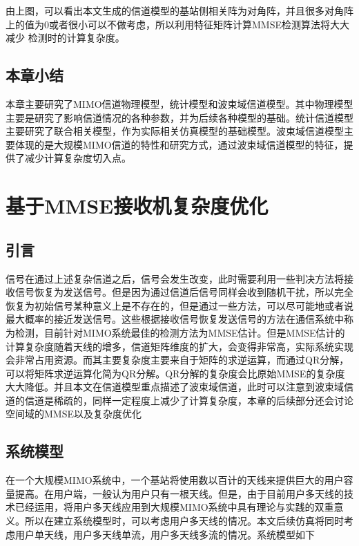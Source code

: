 \documentclass[bachelor,nocolorlinks, printoneside]{seuthesis} %
\begin{document}
\begin{Main}
由上图，可以看出本文生成的信道模型的基站侧相关阵为对角阵，并且很多对角阵上的值为0或者很小可以不做考虑，所以利用特征矩阵计算MMSE检测算法将大大减少
检测时的计算复杂度。

\section{本章小结}
本章主要研究了MIMO信道物理模型，统计模型和波束域信道模型。其中物理模型主要是研究了影响信道情况的各种参数，并为后续各种模型的基础。统计信道模型主要研究了联合相关模型，作为实际相关仿真模型的基础模型。波束域信道模型主要体现的是大规模MIMO信道的特性和研究方式，通过波束域信道模型的特征，提供了减少计算复杂度切入点。

\chapter{基于MMSE接收机复杂度优化}
\section{引言}
信号在通过上述复杂信道之后，信号会发生改变，此时需要利用一些判决方法将接收信号恢复为发送信号。但是因为通过信道后信号同样会收到随机干扰，所以完全恢复为初始信号某种意义上是不存在的，但是通过一些方法，可以尽可能地或者说最大概率的接近发送信号。这些根据接收信号恢复发送信号的方法在通信系统中称为检测，目前针对MIMO系统最佳的检测方法为MMSE估计。但是MMSE估计的计算复杂度随着天线的增多，信道矩阵维度的扩大，会变得非常高，实际系统实现会非常占用资源。而其主要复杂度主要来自于矩阵的求逆运算，而通过QR分解，可以将矩阵求逆运算化简为QR分解。QR分解的复杂度会比原始MMSE的复杂度大大降低。并且本文在信道模型重点描述了波束域信道，此时可以注意到波束域信道的信道是稀疏的，同样一定程度上减少了计算复杂度，本章的后续部分还会讨论空间域的MMSE以及复杂度优化
\section{系统模型}
在一个大规模MIMO系统中，一个基站将使用数以百计的天线来提供巨大的用户容量提高。在用户端，一般认为用户只有一根天线。但是，由于目前用户多天线的技术已经运用，将用户多天线应用到大规模MIMO系统中具有理论与实践的双重意义。所以在建立系统模型时，可以考虑用户多天线的情况。本文后续仿真将同时考虑用户单天线，用户多天线单流，用户多天线多流的情况。系统模型如下


\end{Main}
\end{document}
